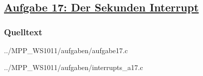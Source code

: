 \subsection
{\href{http://cst.mi.fu-berlin.de/intern/19606-P-MPP/Aufgaben/040601.html}
{Aufgabe 17: Der Sekunden Interrupt}}

\subsubsection*{Quelltext}

{../MPP_WS1011/aufgaben/aufgabe17.c}


{../MPP_WS1011/aufgaben/interrupts_a17.c}
